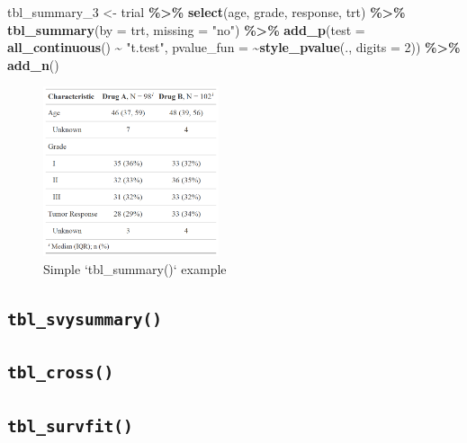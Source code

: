 \documentclass[
]{article}
\newenvironment{Shaded}{\begin{snugshade}}{\end{snugshade}}
\newcommand{\DataTypeTok}[1]{\textcolor[rgb]{0.13,0.29,0.53}{#1}}
\newcommand{\DecValTok}[1]{\textcolor[rgb]{0.00,0.00,0.81}{#1}}
\newcommand{\KeywordTok}[1]{\textcolor[rgb]{0.13,0.29,0.53}{\textbf{#1}}}
\newcommand{\NormalTok}[1]{#1}
\newcommand{\OperatorTok}[1]{\textcolor[rgb]{0.81,0.36,0.00}{\textbf{#1}}}
\newcommand{\StringTok}[1]{\textcolor[rgb]{0.31,0.60,0.02}{#1}}
\begin{document}
\begin{Shaded}
\begin{Highlighting}[]
\NormalTok{tbl\_summary\_}\DecValTok{3}\NormalTok{ <{-}}
\StringTok{  }\NormalTok{trial }\OperatorTok{\%>\%}
\StringTok{  }\KeywordTok{select}\NormalTok{(age, grade, response, trt) }\OperatorTok{\%>\%}
\StringTok{  }\KeywordTok{tbl\_summary}\NormalTok{(}\DataTypeTok{by =}\NormalTok{ trt, }\DataTypeTok{missing =} \StringTok{"no"}\NormalTok{) }\OperatorTok{\%>\%}
\StringTok{  }\KeywordTok{add\_p}\NormalTok{(}\DataTypeTok{test =} \KeywordTok{all\_continuous}\NormalTok{() }\OperatorTok{\textasciitilde{}}\StringTok{ "t.test"}\NormalTok{,}
        \DataTypeTok{pvalue\_fun =} \OperatorTok{\textasciitilde{}}\KeywordTok{style\_pvalue}\NormalTok{(., }\DataTypeTok{digits =} \DecValTok{2}\NormalTok{)) }\OperatorTok{\%>\%}
\StringTok{  }\KeywordTok{add\_n}\NormalTok{()}
\end{Highlighting}
\end{Shaded}

\begin{figure}[h!]
  \caption{Simple `tbl\_summary()` example}
  \label{fig:summary_basic}
  \includegraphics[height=5cm]{summary_basic.png}
  \centering
\end{figure}

\hypertarget{tbl_svysummary}{%
\subsection{\texorpdfstring{\texttt{tbl\_svysummary()}}{tbl\_svysummary()}}\label{tbl_svysummary}}

\hypertarget{tbl_cross}{%
\subsection{\texorpdfstring{\texttt{tbl\_cross()}}{tbl\_cross()}}\label{tbl_cross}}

\hypertarget{tbl_survfit}{%
\subsection{\texorpdfstring{\texttt{tbl\_survfit()}}{tbl\_survfit()}}\label{tbl_survfit}}
\end{document}
